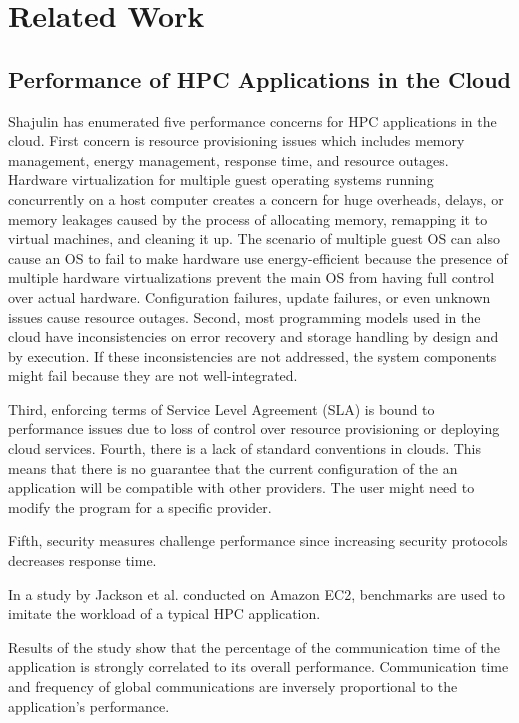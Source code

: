 \section {Related Work}
  
\subsection{Performance of HPC Applications in the Cloud}

Shajulin \cite {8521133920130201} has enumerated five performance concerns for HPC applications in the cloud. First concern is resource provisioning issues which includes memory management, energy management, response time, and resource outages.  Hardware virtualization for multiple guest operating systems running concurrently on a host computer creates a concern for huge overheads, delays, or memory leakages caused by the process of allocating memory, remapping it to virtual machines, and cleaning it up. The scenario of multiple guest OS can also cause an OS to fail to make hardware use energy-efficient because the presence of multiple hardware virtualizations prevent the main OS from having full control over actual hardware. Configuration failures, update failures, or even unknown issues cause resource outages. Second, most programming models used in the cloud have inconsistencies on error recovery and storage handling by design and by execution. If these inconsistencies are not addressed, the system components might fail because they are not well-integrated.        

Third, enforcing terms of Service Level Agreement (SLA) is bound to performance issues due to loss of control over resource provisioning or deploying cloud services. Fourth, there is a lack of standard conventions in clouds. This means that there is no guarantee that the current configuration of the an application will be compatible with other providers. The user might need to modify the program for a specific provider.  
         
Fifth, security measures challenge performance since increasing security protocols decreases response time.

In a study by Jackson et al.\cite{CloudCom2010} conducted on Amazon EC2, benchmarks are used to imitate the workload of a typical HPC application.

Results of the study show that the percentage of the communication time of the application is strongly correlated to its overall performance. Communication time and frequency of global communications are inversely proportional to the application's performance.

